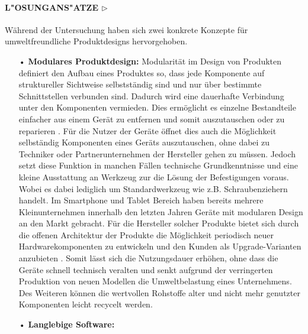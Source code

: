 \documentclass[13pt,titlepage]{article}
\begin{document}
\paragraph{\textbf{L"OSUNGANS"ATZE $\triangleright$}}
Während der Untersuchung haben sich zwei konkrete Konzepte für umweltfreundliche Produktdesigns hervorgehoben. 
\begin{itemize}
\item[•] \textbf{Modulares Produktdesign:}
Modularität im Design von Produkten definiert den Aufbau eines Produktes so, dass jede Komponente auf struktureller Sichtweise selbstständig sind und nur über bestimmte Schnittstellen verbunden sind. Dadurch wird eine dauerhafte Verbindung unter den Komponenten vermieden. Dies ermöglicht es einzelne Bestandteile einfacher aus einem Gerät zu entfernen und somit auszutauschen oder zu reparieren \cite{mp}. Für die Nutzer der Geräte öffnet dies auch die Möglichkeit selbständig Komponenten eines Geräts auszutauschen, ohne dabei zu Techniker oder Partnerunternehmen der Hersteller gehen zu müssen. Jedoch setzt diese Funktion in manchen Fällen technische Grundkenntnisse und eine kleine Ausstattung an Werkzeug zur die Lösung der Befestigungen voraus. Wobei es dabei lediglich um Standardwerkzeug wie z.B. Schraubenziehern handelt. Im Smartphone und Tablet Bereich haben bereits mehrere Kleinunternehmen innerhalb den letzten Jahren Geräte mit modularen Design an den Markt gebracht. Für die Hersteller solcher Produkte bietet sich durch die offenen Architektur der Produkte die Möglichkeit periodisch neuer Hardwarekomponenten zu entwickeln und den Kunden als Upgrade-Varianten anzubieten \cite{modest}. Somit lässt sich die Nutzungsdauer erhöhen, ohne dass die Geräte schnell technisch veralten und senkt aufgrund der verringerten Produktion von neuen Modellen die Umweltbelastung eines Unternehmens. Des Weiteren können die wertvollen Rohstoffe alter und nicht mehr genutzter Komponenten leicht recycelt werden.\\
\item[•] \textbf{Langlebige Software:}

\end{itemize}
\end{document}
